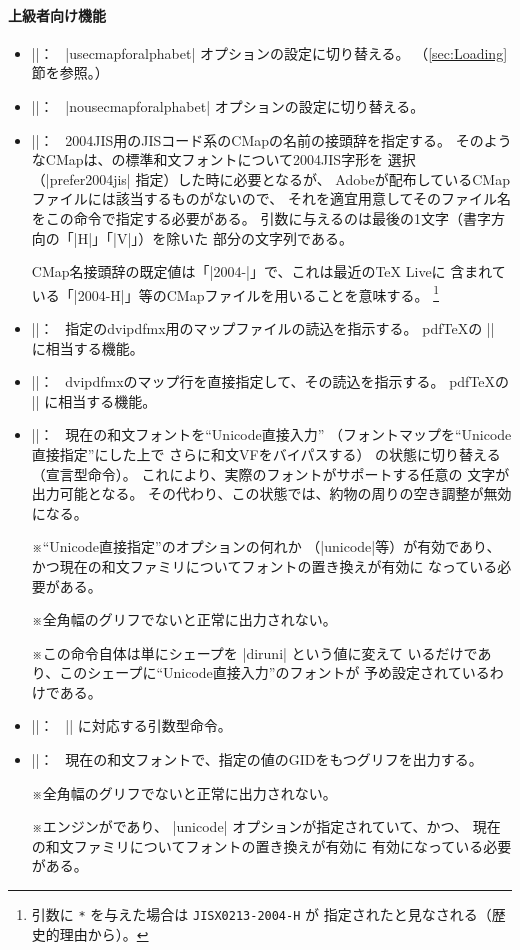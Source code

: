 \documentclass[uplatex,dvipdfmx,a4paper]{jsarticle}
\newcommand{\Meta}[1]{$\langle$\mbox{}#1\mbox{}$\rangle$}
\newcommand{\Note}{\par\noindent ※}
\newcommand{\Means}{：\ }
\begin{document}
\paragraph{上級者向け機能}
\begin{itemize}
\item |\usecmapforalphabet|\Means
  |usecmapforalphabet| オプションの設定に切り替える。
  （\ref{sec:Loading}節を参照。）
\item |\nousecmapforalphabet|\Means
  |nousecmapforalphabet| オプションの設定に切り替える。
\item |\setnewglyphcmapprefix{|\Meta{文字列}|}|\Means
  2004JIS用のJISコード系のCMapの名前の接頭辞を指定する。
  そのようなCMapは、{\pTeX}の標準和文フォントについて2004JIS字形を
  選択（|prefer2004jis| 指定）した時に必要となるが、
  Adobeが配布しているCMapファイルには該当するものがないので、
  それを適宜用意してそのファイル名をこの命令で指定する必要がある。
  引数に与えるのは最後の1文字（書字方向の「|H|」「|V|」）を除いた
  部分の文字列である。\par
  CMap名接頭辞の既定値は「|2004-|」で、これは最近の{\TeX} Liveに
  含まれている「|2004-H|」等のCMapファイルを用いることを意味する。%
  \footnote{%
    引数に \texttt{*} を与えた場合は \texttt{JISX0213-2004-H} が
    指定されたと見なされる（歴史的理由から）。}
\item |\usefontmapfile{|\Meta{マップファイル名}|}|\Means
  指定のdvipdfmx用のマップファイルの読込を指示する。
  pdf{\TeX}の |\pdfmapfile| に相当する機能。
\item |\usefontmapline{|\Meta{マップ行}|}|\Means
  dvipdfmxのマップ行を直接指定して、その読込を指示する。
  pdf{\TeX}の |\pdfmapline| に相当する機能。
\item |\diruni|\Means
  現在の和文フォントを“Unicode直接入力”
  （フォントマップを“Unicode直接指定”にした上で
  さらに和文VFをバイパスする）
  の状態に切り替える（宣言型命令）。
  これにより、実際のフォントがサポートする任意の
  文字が出力可能となる。
  その代わり、この状態では、約物の周りの空き調整が無効になる。
  \Note “Unicode直接指定”のオプションの何れか
  （|unicode|等）が有効であり、
  かつ現在の和文ファミリについてフォントの置き換えが有効に
  なっている必要がある。
  \Note 全角幅のグリフでないと正常に出力されない。
  \Note この命令自体は単にシェープを |diruni| という値に変えて
  いるだけであり、このシェープに“Unicode直接入力”のフォントが
  予め設定されているわけである。
\item |\textdiruni{|\Meta{テキスト}|}|\Means
  |\diruni| に対応する引数型命令。
\item |\gid{|\Meta{整数}|}|\Means
  現在の和文フォントで、指定の値のGIDをもつグリフを出力する。
  \Note 全角幅のグリフでないと正常に出力されない。
  \Note エンジンが{\upLaTeX}であり、
  |unicode| オプションが指定されていて、かつ、
  現在の和文ファミリについてフォントの置き換えが有効に
  有効になっている必要がある。
\end{itemize}
\end{document}
